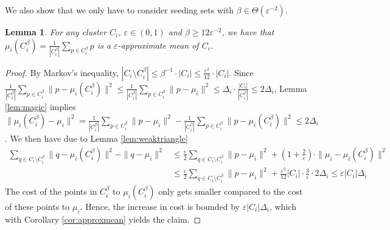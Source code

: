 \documentclass[11pt]{article}
\newtheorem{lemma}[theorem]{Lemma}
\begin{document}
We also show that we only have to consider seeding sets with $ \beta \in \Theta(\varepsilon^{-2})$.
\begin{lemma}
\label{lem:magiccore}
For any cluster $C_i$, $\varepsilon\in (0,1)$ and $\beta\geq 12\varepsilon^{-2}$, we have that $\mu_i(C_i^{\beta}) = \frac{1}{|C_i^{\beta}|} \sum_{p\in C_i^{\beta}}p$ is a $\varepsilon$-approximate mean of $C_i$.
\end{lemma}
\begin{proof}
By Markov's inequality, $|C_i\setminus C_i^{\beta}|\leq \beta^{-1} \cdot|C_i|\leq \frac{\varepsilon^2}{12}\cdot |C_i|$.
Since $\frac{1}{|C_i^{\beta}|}\sum_{p\in C_i^{\beta}}\|p-\mu_i(C_i^{\beta})\|^2 \leq \frac{1}{|C_i^{\beta}|}\sum_{p\in C_i^{\beta}}\|p-\mu_i\|^2 \leq \Delta_i\cdot \frac{|C_i|}{|C_i^{\beta}|}\leq 2\Delta_i$, Lemma \ref{lem:magic} implies $\|\mu_i(C_i^{\beta})-\mu_i\|^2 = \frac{1}{|C_i^{\beta}|}\sum_{p\in C_i^{\beta}}\|p-\mu_i\|^2 - \frac{1}{|C_i^{\beta}|}\sum_{p\in C_i^{\beta}}\|p-\mu_i(C_i^\beta)\|^2 \leq 2\Delta_i$.
We then have due to Lemma \ref{lem:weaktriangle}
\begin{align*}
\sum_{q\in C_i\setminus C_i^{\beta}} \|q-\mu_i(C_i^{\beta})\|^2 - \|q-\mu_i\|^2 & \leq \frac{\varepsilon}{2} \sum_{q\in C_i\setminus C_i^{\beta}} \|p-\mu_i\|^2 + \left(1+\frac{2}{\varepsilon} \right)\cdot  \|\mu_i - \mu_i(C_i^\beta)\|^2 \\
&\leq \frac{\varepsilon}{2} \sum_{q\in C_i\setminus C_i^{\beta}} \|p-\mu_i\|^2 + \frac{\varepsilon^2}{12} |C_i|\cdot \frac{3}{\varepsilon} \cdot 2\Delta_i \leq \varepsilon |C_i|\Delta_i
\end{align*}
The cost of the points in $C_i^\beta$ to $\mu_i(C_i^\beta)$ only gets smaller compared to the cost of these points to $\mu_i$. Hence, the increase in cost is bounded by $\varepsilon |C_i|\Delta_i$, which with Corollary \ref{cor:approxmean} yields the claim.
\end{proof}
\end{document}
